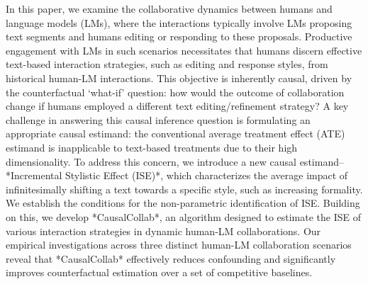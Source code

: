 In this paper, we examine the collaborative dynamics between humans and language models (LMs), where the interactions typically involve LMs proposing text segments and humans editing or responding to these proposals. Productive engagement with LMs in such scenarios necessitates that humans discern effective text-based interaction strategies, such as editing and response styles, from historical human-LM interactions. This objective is inherently causal, driven by the counterfactual `what-if' question: how would the outcome of collaboration change if humans employed a different text editing/refinement strategy? A key challenge in answering this causal inference question is formulating an appropriate causal estimand: the conventional average treatment effect (ATE) estimand is inapplicable to text-based treatments due to their high dimensionality. To address this concern, we introduce a new causal estimand-- *Incremental Stylistic Effect (ISE)*, which characterizes the average impact of infinitesimally shifting a text towards a specific style, such as increasing formality. We establish the conditions for the non-parametric identification of ISE. Building on this, we develop *CausalCollab*, an algorithm designed to estimate the ISE of various interaction strategies in dynamic human-LM collaborations. Our empirical investigations across three distinct human-LM collaboration scenarios reveal that *CausalCollab* effectively reduces confounding and significantly improves counterfactual estimation over a set of competitive baselines.